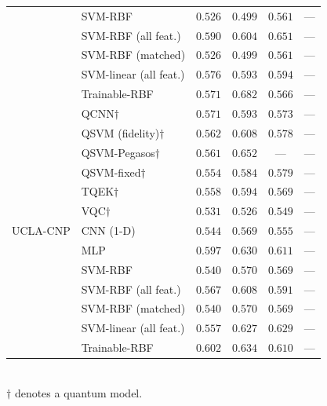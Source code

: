 \begin{table}[t]
\begin{tabular}{|l|l|c|c|c|c|}
  & SVM-RBF & $0.526$ & $0.499$ & $0.561$ & --- \\
  & SVM-RBF (all feat.) & $0.590$ & $0.604$ & $0.651$ & --- \\
  & SVM-RBF (matched) & $0.526$ & $0.499$ & $0.561$ & --- \\
  & SVM-linear (all feat.) & $0.576$ & $0.593$ & $0.594$ & --- \\
  & Trainable-RBF & $0.571$ & $0.682$ & $0.566$ & --- \\
\hline
 \multirow{13}{*}{UCLA-CNP} & QCNN$\dagger$ & $0.571$ & $0.593$ & $0.573$ & --- \\
  & QSVM (fidelity)$\dagger$ & $0.562$ & $0.608$ & $0.578$ & --- \\
  & QSVM-Pegasos$\dagger$ & $0.561$ & $0.652$ & --- & --- \\
  & QSVM-fixed$\dagger$ & $0.554$ & $0.584$ & $0.579$ & --- \\
  & TQEK$\dagger$ & $0.558$ & $0.594$ & $0.569$ & --- \\
  & VQC$\dagger$ & $0.531$ & $0.526$ & $0.549$ & --- \\
  & CNN (1-D) & $0.544$ & $0.569$ & $0.555$ & --- \\
  & MLP & $0.597$ & $0.630$ & $0.611$ & --- \\
  & SVM-RBF & $0.540$ & $0.570$ & $0.569$ & --- \\
  & SVM-RBF (all feat.) & $0.567$ & $0.608$ & $0.591$ & --- \\
  & SVM-RBF (matched) & $0.540$ & $0.570$ & $0.569$ & --- \\
  & SVM-linear (all feat.) & $0.557$ & $0.627$ & $0.629$ & --- \\
  & Trainable-RBF & $0.602$ & $0.634$ & $0.610$ & --- \\
\hline
\end{tabular}
\\[2pt]
\footnotesize $\dagger$ denotes a quantum model.
\end{table}
